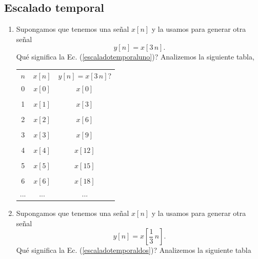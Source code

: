 \subsection{Escalado temporal}

\begin{enumerate}
\item Supongamos que tenemos una se\~{n}al $x[n]$ y la usamos para
generar otra se\~{n}al 
\begin{equation}
y[n] = x[3 \, n]. \label{escaladotemporaluno}
\end{equation}
\textquestiondown Qu\'{e} significa la
  Ec. (\ref{escaladotemporaluno})?
Analizemos la siguiente tabla, 

\begin{tabular}{ccc}
$n$ & $x[n]$ & $y[n] = x[3 \, n]$? \\
0   &  $x[0]$ & $x[0]$ \\
& & \\
1   &  $x[1]$ & $x[3]$ \\
& & \\
2   &  $x[2]$ & $x[6]$ \\
& & \\
3   &  $x[3]$ & $x[9]$ \\
& & \\
4   &  $x[4]$ & $x[12]$ \\
& & \\
5   &  $x[5]$ & $x[15]$ \\
& & \\
6   &  $x[6]$ & $x[18]$ \\
... &  ... & ...
\end{tabular}

\item Supongamos que tenemos una se\~{n}al $x[n]$ y la usamos para
generar otra se\~{n}al 
\begin{equation}
y[n] = x[\frac{1}{3} \, n]. \label{escaladotemporaldos}
\end{equation}
\textquestiondown Qu\'{e} significa la Ec. (\ref{escaladotemporaldos})?
Analizemos la siguiente tabla


\end{enumerate}
